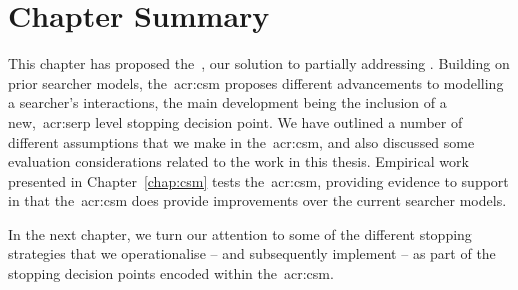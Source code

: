 \section{Chapter Summary}
This chapter has proposed the~, our solution to partially addressing . Building on prior searcher models, the~\gls{acr:csm} proposes different advancements to modelling a searcher's interactions, the main development being the inclusion of a new,~\gls{acr:serp} level stopping decision point. We have outlined a number of different assumptions that we make in the~\gls{acr:csm}, and also discussed some evaluation considerations related to the work in this thesis. Empirical work presented in Chapter~\ref{chap:csm} tests the~\gls{acr:csm}, providing evidence to support  in that the~\gls{acr:csm} does provide improvements over the current searcher models.

In the next chapter, we turn our attention to some of the different stopping strategies that we operationalise -- and subsequently implement -- as part of the stopping decision points encoded within the~\gls{acr:csm}.